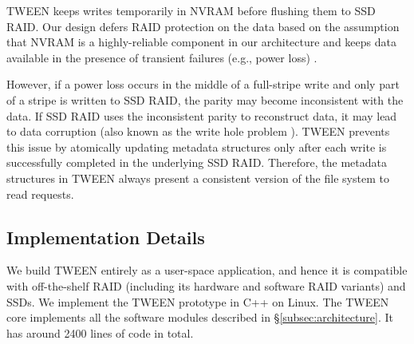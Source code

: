 
TWEEN keeps writes temporarily in NVRAM before flushing them to SSD RAID. Our design
defers RAID protection on the data based on the assumption that NVRAM is a
highly-reliable component in our architecture and keeps data available in the
presence of transient failures (e.g., power loss) \cite{jung10}. 


However, if a power loss occurs in the middle of a full-stripe write and only
part of a stripe is written to SSD RAID, the parity may become inconsistent with the
data. If SSD RAID uses the inconsistent parity to
reconstruct data, it may lead to data corruption (also known as the write hole
problem \cite{appuswamy10}).
TWEEN prevents this issue by atomically updating metadata structures 
only after each write is successfully completed in the underlying SSD RAID.
Therefore, the metadata structures in TWEEN always present a consistent
version of the file system to read requests. 

\subsection{Implementation Details}
\label{subsec:implementation}

We build TWEEN entirely as a user-space application, and hence it is
compatible with off-the-shelf RAID (including its hardware and software RAID
variants) and SSDs.   We implement the TWEEN prototype in C++ on Linux.  The
TWEEN core implements all the software modules described in
\S\ref{subsec:architecture}.  It has around \num{2400} lines of code
in total. 


